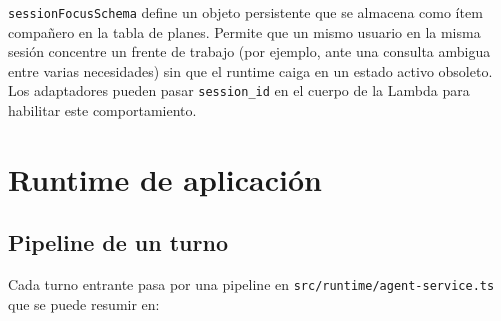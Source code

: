 \documentclass[11pt,a4paper]{article}
\begin{document}
\texttt{sessionFocusSchema} define un objeto persistente que se almacena
como ítem compañero en la tabla de planes. Permite que un mismo usuario
en la misma sesión concentre un frente de trabajo (por ejemplo, ante una
consulta ambigua entre varias necesidades) sin que el runtime caiga en un
estado activo obsoleto. Los adaptadores pueden pasar \texttt{session\_id}
en el cuerpo de la Lambda para habilitar este comportamiento.

\section{Runtime de aplicación}

\subsection{Pipeline de un turno}

Cada turno entrante pasa por una pipeline en
\texttt{src/runtime/agent-service.ts} que se puede resumir en:
\end{document}
